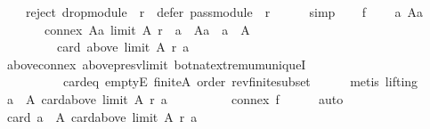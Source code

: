 \begin{isabellebody}
\ \ \ \ {\isachardoublequoteopen}reject\ {\isacharparenleft}{\kern0pt}drop{\isacharunderscore}{\kern0pt}module\ {}\ r{\isacharparenright}{\kern0pt}\ {\isacharequal}{\kern0pt}\ defer\ {\isacharparenleft}{\kern0pt}pass{\isacharunderscore}{\kern0pt}module\ {}\ r{\isacharparenright}{\kern0pt}{\isachardoublequoteclose}\isanewline
\ \ \ \ \isamarkupfalse%
\ simp\isanewline
\ \ \isamarkupfalse%
\ f{}{\isacharcolon}{\kern0pt}\isanewline
\ \ \ \ {\isachardoublequoteopen}{\isasymforall}a\ Aa{\isachardot}{\kern0pt}\isanewline
\ \ \ \ \ \ {\isasymnot}\ connex\ Aa\ {\isacharparenleft}{\kern0pt}limit\ A\ r{\isacharparenright}{\kern0pt}\ {\isasymor}\ a\ {\isasymnotin}\ Aa\ {\isasymor}\ a\ {\isasymnotin}\ A\ {\isasymor}\isanewline
\ \ \ \ \ \ \ \ {\isasymnot}\ card\ {\isacharparenleft}{\kern0pt}above\ {\isacharparenleft}{\kern0pt}limit\ A\ r{\isacharparenright}{\kern0pt}\ a{\isacharparenright}{\kern0pt}\ {\isasymle}\ {}{\isachardoublequoteclose}\isanewline
\ \ \ \ \isamarkupfalse%
\ above{\isacharunderscore}{\kern0pt}connex\ above{\isacharunderscore}{\kern0pt}presv{\isacharunderscore}{\kern0pt}limit\ bot{\isacharunderscore}{\kern0pt}nat{\isacharunderscore}{\kern0pt}{}{\isachardot}{\kern0pt}extremum{\isacharunderscore}{\kern0pt}uniqueI\isanewline
\ \ \ \ \ \ \ \ \ \ card{\isacharunderscore}{\kern0pt}{}{\isacharunderscore}{\kern0pt}eq\ emptyE\ finite{\isacharunderscore}{\kern0pt}A\ order\ rev{\isacharunderscore}{\kern0pt}finite{\isacharunderscore}{\kern0pt}subset\isanewline
\ \ \ \ \isamarkupfalse%
\ {\isacharparenleft}{\kern0pt}metis\ {\isacharparenleft}{\kern0pt}lifting{\isacharparenright}{\kern0pt}{\isacharparenright}{\kern0pt}\isanewline
\ \ \isamarkupfalse%
\ {\isachardoublequoteopen}{\isacharbraceleft}{\kern0pt}a\ {\isasymin}\ A{\isachardot}{\kern0pt}\ card{\isacharparenleft}{\kern0pt}above\ {\isacharparenleft}{\kern0pt}limit\ A\ r{\isacharparenright}{\kern0pt}\ a{\isacharparenright}{\kern0pt}\ {\isasymle}\ {}{\isacharbraceright}{\kern0pt}\ {\isacharequal}{\kern0pt}\ {\isacharbraceleft}{\kern0pt}{\isacharbraceright}{\kern0pt}{\isachardoublequoteclose}\isanewline
\ \ \ \ \isamarkupfalse%
\ connex\ f{}\isanewline
\ \ \ \ \isamarkupfalse%
\ auto\isanewline
\ \ \isamarkupfalse%
\ {\isachardoublequoteopen}card\ {\isacharbraceleft}{\kern0pt}a\ {\isasymin}\ A{\isachardot}{\kern0pt}\ card{\isacharparenleft}{\kern0pt}above\ {\isacharparenleft}{\kern0pt}limit\ A\ r{\isacharparenright}{\kern0pt}\ a{\isacharparenright}{\kern0pt}\ {\isasymle}\ {}{\isacharbraceright}{\kern0pt}\ {\isacharequal}{\kern0pt}\ {}{\isachardoublequoteclose}\isanewline

\end{isabellebody}
